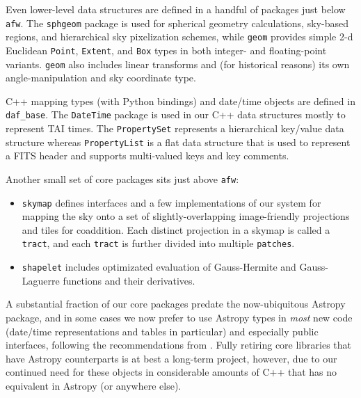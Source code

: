 Even lower-level data structures are defined in a handful of packages just below \texttt{afw}.
The \texttt{sphgeom} package is used for spherical geometry calculations, sky-based regions, and hierarchical sky pixelization schemes, while \texttt{geom} provides simple 2-d Euclidean \texttt{Point}, \texttt{Extent}, and \texttt{Box} types in both integer- and floating-point variants.
\texttt{geom} also includes linear transforms and (for historical reasons) its own angle-manipulation and sky coordinate type.

C++ mapping types (with Python bindings) and date/time objects are defined in \texttt{daf\_base}.
The \texttt{DateTime} package is used in our C++ data structures mostly to represent TAI times.
The \texttt{PropertySet} represents a hierarchical key/value data structure whereas \texttt{PropertyList} is a flat data structure that is used to represent a FITS header and supports multi-valued keys and key comments.

Another small set of core packages sits just above \texttt{afw}:
\begin{itemize}
\item \texttt{skymap} defines interfaces and a few implementations of our system for mapping the sky onto a set of slightly-overlapping image-friendly projections and tiles for coaddition.
Each distinct projection in a skymap is called a \texttt{tract}, and each \texttt{tract} is further divided into multiple \texttt{patches}.
\item \texttt{shapelet} includes optimizated evaluation of Gauss-Hermite and Gauss-Laguerre functions and their derivatives.
\end{itemize}

A substantial fraction of our core packages predate the now-ubiquitous Astropy package, and in some cases we now prefer to use Astropy types in \emph{most} new code (date/time representations and tables in particular) and especially public interfaces, following the recommendations from \citet{2016SPIE.9913E..0GJ}.
Fully retiring core libraries that have Astropy counterparts is at best a long-term project, however, due to our continued need for these objects in considerable amounts of C++ that has no equivalent in Astropy (or anywhere else).
